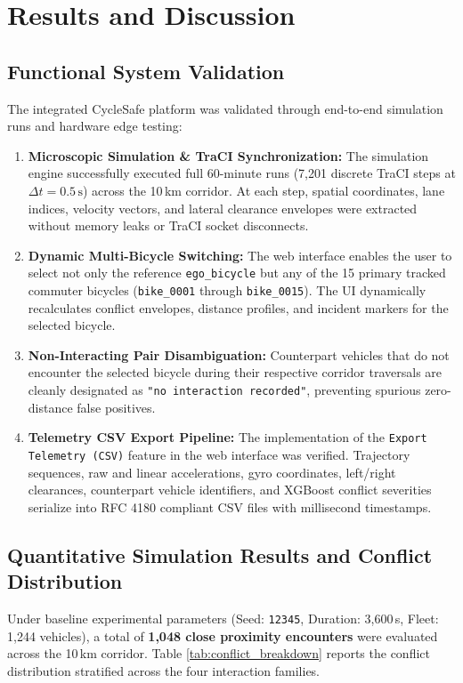 \chapter{Results and Discussion}
\label{chap:results}

\section{Functional System Validation}
\label{sec:functional_validation}
The integrated CycleSafe platform was validated through end-to-end simulation runs and hardware edge testing:

\begin{enumerate}
    \item \textbf{Microscopic Simulation \& TraCI Synchronization:} The simulation engine successfully executed full 60-minute runs (7,201 discrete TraCI steps at $\Delta t = 0.5\,\text{s}$) across the 10\,km corridor. At each step, spatial coordinates, lane indices, velocity vectors, and lateral clearance envelopes were extracted without memory leaks or TraCI socket disconnects.
    \item \textbf{Dynamic Multi-Bicycle Switching:} The web interface enables the user to select not only the reference \texttt{ego\_bicycle} but any of the 15 primary tracked commuter bicycles (\texttt{bike\_0001} through \texttt{bike\_0015}). The UI dynamically recalculates conflict envelopes, distance profiles, and incident markers for the selected bicycle.
    \item \textbf{Non-Interacting Pair Disambiguation:} Counterpart vehicles that do not encounter the selected bicycle during their respective corridor traversals are cleanly designated as \texttt{"no interaction recorded"}, preventing spurious zero-distance false positives.
    \item \textbf{Telemetry CSV Export Pipeline:} The implementation of the \texttt{Export Telemetry (CSV)} feature in the web interface was verified. Trajectory sequences, raw and linear accelerations, gyro coordinates, left/right clearances, counterpart vehicle identifiers, and XGBoost conflict severities serialize into RFC 4180 compliant CSV files with millisecond timestamps.
\end{enumerate}

\section{Quantitative Simulation Results and Conflict Distribution}
Under baseline experimental parameters (Seed: \texttt{12345}, Duration: 3,600\,s, Fleet: 1,244 vehicles), a total of \textbf{1,048 close proximity encounters} were evaluated across the 10\,km corridor. Table \ref{tab:conflict_breakdown} reports the conflict distribution stratified across the four interaction families.

